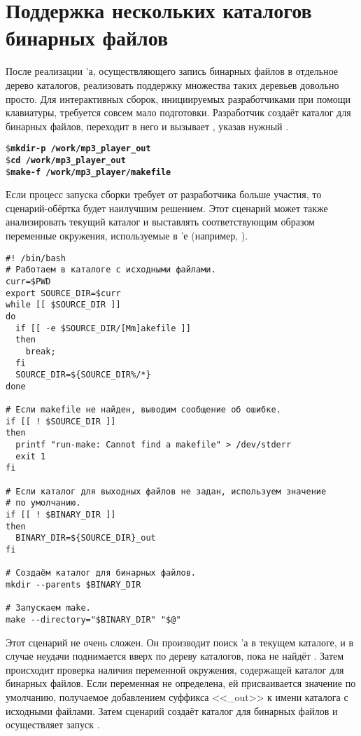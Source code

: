 \section{Поддержка нескольких каталогов бинарных файлов}
\label{sec:supporting_multiple_binary_trees}

После реализации \Makefile{}'а, осуществляющего запись бинарных файлов
в отдельное дерево каталогов, реализовать поддержку множества таких
деревьев довольно просто. Для интерактивных сборок, инициируемых
разработчиками при помощи клавиатуры, требуется совсем мало
подготовки. Разработчик создаёт каталог для бинарных файлов, переходит
в него и вызывает \GNUmake{}, указав нужный \Makefile{}.

{\footnotesize
\begin{alltt}
\$ \textbf{mkdir -p ~/work/mp3\_player\_out}
\$ \textbf{cd ~/work/mp3\_player\_out}
\$ \textbf{make -f ~/work/mp3\_player/makefile}
\end{alltt}
}

Если процесс запуска сборки требует от разработчика больше участия, то
сценарий\hyp{}обёртка будет наилучшим решением. Этот сценарий может
также анализировать текущий каталог и выставлять соответствующим
образом переменные окружения, используемые в \Makefile{}'е (например,
).

{\footnotesize
\begin{verbatim}
#! /bin/bash
# Работаем в каталоге с исходными файлами.
curr=$PWD
export SOURCE_DIR=$curr
while [[ $SOURCE_DIR ]]
do
  if [[ -e $SOURCE_DIR/[Mm]akefile ]]
  then
    break;
  fi
  SOURCE_DIR=${SOURCE_DIR%/*}
done

# Если makefile не найден, выводим сообщение об ошибке.
if [[ ! $SOURCE_DIR ]]
then
  printf "run-make: Cannot find a makefile" > /dev/stderr
  exit 1
fi

# Если каталог для выходных файлов не задан, используем значение
# по умолчанию.
if [[ ! $BINARY_DIR ]]
then
  BINARY_DIR=${SOURCE_DIR}_out
fi

# Создаём каталог для бинарных файлов.
mkdir --parents $BINARY_DIR

# Запускаем make.
make --directory="$BINARY_DIR" "$@"
\end{verbatim}
}

Этот сценарий не очень сложен. Он производит поиск \Makefile{}'а в
текущем каталоге, и в случае неудачи поднимается вверх по дереву
каталогов, пока не найдёт \Makefile{}. Затем происходит проверка
наличия переменной окружения, содержащей каталог для бинарных файлов.
Если переменная не определена, ей присваивается значение по умолчанию,
получаемое добавлением суффикса <<\_out>> к имени каталога с исходными
файлами. Затем сценарий создаёт каталог для бинарных файлов и
осуществляет запуск \GNUmake{}.

